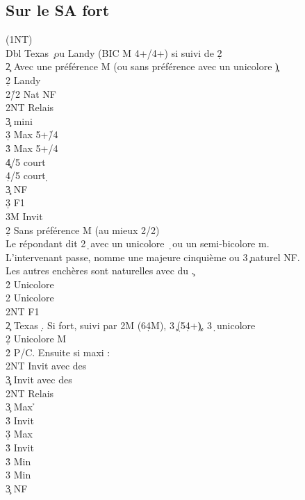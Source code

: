 \documentclass[a4paper]{article}
\begin{document}
\subsection{Sur le SA fort}

\begin{bidtable}
(1NT)\+\\
Dbl \> Texas \c\ ou Landy (BIC M 4+/4+) si suivi de 2\d \+\\
2\c \> Avec une préférence M (ou sans préférence avec un unicolore \c )\+\\
2\d \> Landy\+\\
2\h/2\s \> Nat NF\\
2NT \> Relais\+\\
3\c \> mini\\
3\d \> Max 5+\h /4\s \\
3\h \> Max 5+\s /4\h \\
4\c {}/5 court \c \\
4\d {}/5 court \d \-\\
3\c \> NF\\
3\d \> F1\\
3M \> Invit\-\-\\
2\d \> Sans préférence M (au mieux 2/2)\\
\>Le répondant dit 2\d\ avec un unicolore \d\ ou un semi-bicolore m. \\
\>L'intervenant passe, nomme une majeure cinquième ou 3\c\ naturel NF. \\
\>Les autres enchères sont naturelles avec du \c .\\
2\h \> Unicolore\\
2\s \> Unicolore\\
2NT \> F1\-\\
2\c \> Texas \d . Si fort, suivi par 2M (6\d 4M), 3\c\ (5\d 4+\c ), 3\d\ unicolore\\
2\d \> Unicolore M\+\\
2\h\s \> P/C. Ensuite si maxi :\+\\
2NT \> Invit avec des \h \\
3\c\d \> Invit avec des \s \-\\
2NT \> Relais\+\\
3\c \> Max \h \+\\
3\h\s \> Invit\-\\
3\d \> Max \s \+\\
3\h\s \> Invit\-\\
3\h \> Min \h \\
3\s \> Min \s \-\\
3\c \> NF\\

\end{bidtable}
\end{document}
